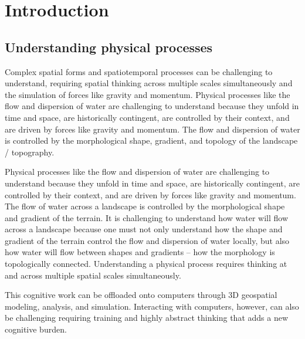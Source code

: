 \documentclass{isprs}
\begin{document}

\maketitle

\section{Introduction}\label{sec:introduction}

\subsection{Understanding physical processes}
Complex spatial forms and spatiotemporal processes can be challenging to understand, requiring spatial thinking across multiple scales simultaneously and the simulation of forces like gravity and momentum. Physical processes like the flow and dispersion of water are challenging to understand because they unfold in time and space, are historically contingent, are controlled by their context, and are driven by forces like gravity and momentum. The flow and dispersion of water is controlled by the morphological shape, gradient, and topology of the landscape / topography.

Physical processes like the flow and dispersion of water are challenging to understand because they unfold in time and space, are historically contingent, are controlled by their context, and are driven by forces like gravity and momentum. The flow of water across a landscape is controlled by the morphological shape and gradient of the terrain. It is challenging to understand how water will flow across a landscape because one must not only understand how the shape and gradient of the terrain control the flow and dispersion of water locally, but also how water will flow between shapes and gradients – how the morphology is topologically connected. Understanding a physical process requires thinking at and across multiple spatial scales simultaneously. 

This cognitive work can be offloaded onto computers through 3D geospatial modeling, analysis, and simulation. Interacting with computers, however, can also be challenging requiring training and highly abstract thinking that adds a new cognitive burden.
\end{document}
